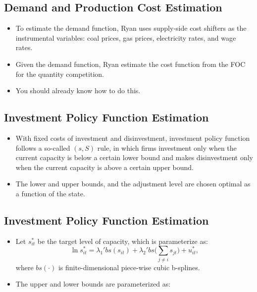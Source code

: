\documentclass[
]{book}
\providecommand{\tightlist}{%
  \setlength{\itemsep}{0pt}\setlength{\parskip}{0pt}}
\begin{document}
\hypertarget{demand-and-production-cost-estimation}{%
\subsection{Demand and Production Cost Estimation}\label{demand-and-production-cost-estimation}}

\begin{itemize}
\tightlist
\item
  To estimate the demand function, Ryan uses supply-side cost shifters
  as the instrumental variables: coal prices, gas prices, electricity
  rates, and wage rates.
\item
  Given the demand function, Ryan estimate the cost function from the
  FOC for the quantity competition.
\item
  You should already know how to do this.
\end{itemize}

\hypertarget{investment-policy-function-estimation}{%
\subsection{Investment Policy Function Estimation}\label{investment-policy-function-estimation}}

\begin{itemize}
\tightlist
\item
  With fixed costs of investment and disinvestment, investment policy
  function follows a so-called \((s, S)\) rule, in which firms
  investment only when the current capacity is below a certain lower
  bound and makes disinvestment only when the current capacity is
  above a certain upper bound.
\item
  The lower and upper bounds, and the adjustment level are chosen
  optimal as a function of the state.
\end{itemize}

\hypertarget{investment-policy-function-estimation-1}{%
\subsection{Investment Policy Function Estimation}\label{investment-policy-function-estimation-1}}

\begin{itemize}
\tightlist
\item
  Let \(s_{it}^*\) be the target level of capacity, which is
  parameterize as: \begin{equation}
  \ln s_{it}^* = \lambda_1' bs(s_{it}) + \lambda_2' bs \Bigg(\sum_{j \neq i} s_{jt}\Bigg) + u_{it}^*,
  \end{equation} where \(bs(\cdot)\) is finite-dimensional piece-wise
  cubic b-splines.
\item
  The upper and lower bounds are parameterized as:
\end{itemize}
\end{document}

